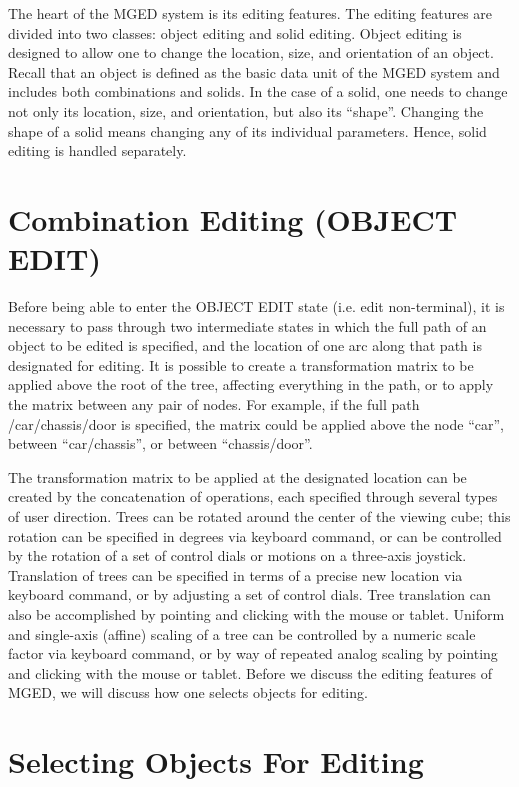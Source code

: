 The heart of the MGED system is its editing features.
The editing features are divided into two classes: object editing
and solid editing.
Object editing is designed to allow one to change the location,
size, and orientation of an object.
Recall that an object is defined as the basic data unit of the
MGED system and includes both combinations and solids.
In the case of a solid, one needs to change not only its location,
size, and orientation, but also its ``shape''.
Changing the shape of a solid means changing any of its individual parameters.
Hence, solid editing is handled separately.

\section{Combination Editing (OBJECT EDIT)}

Before being able to enter the OBJECT EDIT state
(i.e. edit non-terminal),
it is necessary to pass through two intermediate states
in which the full path of an object to be edited is specified,
and the location of one arc along that path is designated for editing.
It is possible to create a transformation matrix to be applied
above the root of the tree, affecting everything in the path,
or to apply the matrix between any pair of nodes.
For example, if the full path /car/chassis/door is specified,
the matrix could be applied above the node ``car'', between
``car/chassis'', or between ``chassis/door''.

The transformation matrix to be applied at the
designated location can be created by the concatenation of
operations, each specified through several types of user direction.
Trees can be rotated around the center of the viewing cube;
this rotation can be specified in degrees via keyboard command, or can
be controlled by the rotation of a set of control dials or motions on
a three-axis joystick.
Translation of trees can be specified in terms of a precise new location
via keyboard command, or by adjusting a set of control dials.
Tree translation can also be accomplished by pointing and
clicking with the mouse or tablet.
Uniform and single-axis (affine) scaling of a tree can be controlled
by a numeric scale factor via keyboard command, or by way of repeated
analog scaling by pointing and clicking with the mouse or tablet.
Before we discuss the editing features of MGED, we will discuss
how one selects objects for editing.

\section{Selecting Objects For Editing}


